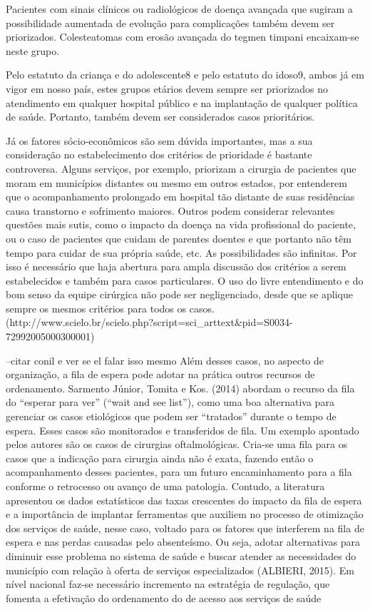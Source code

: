 Pacientes com sinais clínicos ou radiológicos de doença avançada que sugiram a possibilidade aumentada de evolução para complicações também devem ser priorizados. Colesteatomas com erosão avançada do tegmen timpani encaixam-se neste grupo.

Pelo estatuto da criança e do adolescente8 e pelo estatuto do idoso9, ambos já em vigor em nosso país, estes grupos etários devem sempre ser priorizados no atendimento em qualquer hospital público e na implantação de qualquer política de saúde. Portanto, também devem ser considerados casos prioritários.

Já os fatores sócio-econômicos são sem dúvida importantes, mas a sua consideração no estabelecimento dos critérios de prioridade é bastante controversa. Alguns serviços, por exemplo, priorizam a cirurgia de pacientes que moram em municípios distantes ou mesmo em outros estados, por entenderem que o acompanhamento prolongado em hospital tão distante de suas residências causa transtorno e sofrimento maiores. Outros podem considerar relevantes questões mais sutis, como o impacto da doença na vida profissional do paciente, ou o caso de pacientes que cuidam de parentes doentes e que portanto não têm tempo para cuidar de sua própria saúde, etc. As possibilidades são infinitas. Por isso é necessário que haja abertura para ampla discussão dos critérios a serem estabelecidos e também para casos particulares. O uso do livre entendimento e do bom senso da equipe cirúrgica não pode ser negligenciado, desde que se aplique sempre os mesmos critérios para todos os casos.
(http://www.scielo.br/scielo.php?script=sci_arttext&pid=S0034-72992005000300001)
    

--citar conil e ver se el falar isso mesmo
Além desses casos, no aspecto de organização, a fila de espera pode adotar
na prática outros recursos de ordenamento. Sarmento Júnior, Tomita e Kos. (2014)
abordam o recurso da fila do “esperar para ver” (“wait and see list”), como uma boa
alternativa para gerenciar os casos etiológicos que podem ser “tratados” durante o
tempo de espera. Esses casos são monitorados e transferidos de fila. Um exemplo
apontado pelos autores são os casos de cirurgias oftalmológicas. Cria-se uma fila
para os casos que a indicação para cirurgia ainda não é exata, fazendo então o
acompanhamento desses pacientes, para um futuro encaminhamento para a fila
conforme o retrocesso ou avanço de uma patologia.
Contudo, a literatura apresentou os dados estatísticos das taxas crescentes
do impacto da fila de espera e a importância de implantar ferramentas que auxiliem
no processo de otimização dos serviços de saúde, nesse caso, voltado para os
fatores que interferem na fila de espera e nas perdas causadas pelo absenteísmo.
Ou seja, adotar alternativas para diminuir esse problema no sistema de saúde e
buscar atender as necessidades do município com relação à oferta de serviços
especializados (ALBIERI, 2015).
Em nível nacional faz-se necessário incremento na estratégia de regulação,
que fomenta a efetivação do ordenamento do de acesso aos serviços de saúde
    
